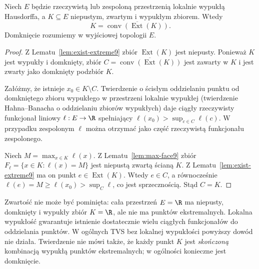 \begin{twierdzenie}
\label{thm:krein-milman}
Niech $E$ będzie rzeczywistą lub zespoloną przestrzenią
lokalnie wypukłą Hausdorffa, a $K\subseteq E$ niepustym,
zwartym i wypukłym zbiorem. Wtedy
\[
 K=\overline{\operatorname{conv}(\operatorname{Ext}(K))}.
\]
Domknięcie rozumiemy w wyjściowej topologii $E$.
\end{twierdzenie}
\begin{proof}
Z Lematu~\ref{lem:exist-extreme9} zbiór
$\operatorname{Ext}(K)$ jest niepusty. Ponieważ $K$ jest
wypukły i domknięty, zbiór
$C=\overline{\operatorname{conv}(\operatorname{Ext}(K))}$
jest zawarty w $K$ i jest zwarty jako domknięty podzbiór $K$.

Załóżmy, że istnieje $x_0\in K\setminus C$.
Twierdzenie o ścisłym oddzielaniu punktu od domkniętego
zbioru wypukłego w przestrzeni lokalnie wypukłej
(twierdzenie Hahna--Banacha o oddzielaniu zbiorów wypukłych) daje ciągły
rzeczywisty funkcjonał liniowy $\ell:E\to\R$ spełniający
$\ell(x_0)>\sup_{c\in C}\ell(c)$. W przypadku zespolonym
$\ell$ można otrzymać jako część rzeczywistą funkcjonału
zespolonego.

Niech $M=\max_{x\in K}\ell(x)$.
Z Lematu~\ref{lem:max-face9} zbiór
$F_\ell=\{x\in K:\ell(x)=M\}$ jest niepustą zwartą
ścianą $K$. Z Lematu~\ref{lem:exist-extreme9}
ma on punkt $e\in\operatorname{Ext}(K)$.
Wtedy $e\in C$, a równocześnie
$\ell(e)=M\ge\ell(x_0)>\sup_C\ell$, co jest sprzecznością.
Stąd $C=K$.
\end{proof}

\begin{uwaga}
Zwartość nie może być pominięta: cała przestrzeń $E=\R$
ma niepusty, domknięty i wypukły zbiór $K=\R$,
ale nie ma punktów ekstremalnych. Lokalna wypukłość
gwarantuje istnienie dostatecznie wielu ciągłych
funkcjonałów do oddzielania punktów. W ogólnych TVS
bez lokalnej wypukłości powyższy dowód nie działa.
Twierdzenie nie mówi także, że każdy punkt $K$ jest
\emph{skończoną} kombinacją wypukłą punktów ekstremalnych;
w ogólności konieczne jest domknięcie.
\end{uwaga}

